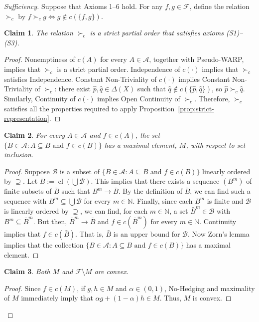 \documentclass[11pt]{article}
\newtheorem{claim}{Claim}
\begin{document}
\begin{proof}[Sufficiency]
Suppose that Axioms 1--6 hold.
For any $f,g\in\mathcal{F}$, define the relation $\succ_c$ by
$f\succ_c g\Longleftrightarrow g\notin c(\{f,g\})$.

\begin{claim}\label{cl:binary-order}
The relation $\succ_c$ is a strict partial order that satisfies axioms
(S1)--(S3).
\end{claim}
\begin{proof}
Nonemptiness of $c(A)$ for every $A\in\mathcal{A}$, together with
Pseudo-WARP, implies that $\succ_c$ is a strict partial order.
Independence of $c(\cdot)$ implies that $\succ_c$ satisfies Independence.
Constant Non-Triviality of $c(\cdot)$ implies Constant Non-Triviality
of $\succ_c$: there exist $\hat p,\hat q\in\Delta(X)$ such that
$\hat q\notin c(\{\hat p,\hat q\})$, so $\hat p\succ_c\hat q$.
Similarly, Continuity of $c(\cdot)$ implies Open Continuity of $\succ_c$.
Therefore, $\succ_c$ satisfies all the properties required to apply
Proposition~\ref{prop:strict-representation}.
\end{proof}

\begin{claim}\label{cl:maximal-menu}
For every $A\in\mathcal{A}$ and $f\in c(A)$, the set
$\{B\in\mathcal{A}: A\subseteq B\text{ and }f\in c(B)\}$ has a maximal
element, $M$, with respect to set inclusion.
\end{claim}
\begin{proof}
Suppose $\mathcal{B}$ is a subset of
$\{B\in\mathcal{A}: A\subseteq B\text{ and }f\in c(B)\}$ linearly ordered
by $\supseteq$. Let $\bar{B}:=\operatorname{cl}(\bigcup\mathcal{B})$.
This implies that there exists a sequence $(B^m)$ of finite subsets of
$\bar{B}$ such that $B^m\to\bar{B}$. By the definition of $\bar{B}$, we
can find such a sequence with $B^m\subseteq\bigcup\mathcal{B}$ for every
$m\in\mathbb{N}$. Finally, since each $B^m$ is finite and $\mathcal{B}$
is linearly ordered by $\supseteq$, we can find, for each $m\in\mathbb{N}$,
a set $\bar{B}^m\in\mathcal{B}$ with $B^m\subseteq\bar{B}^m$. But then,
$\bar{B}^m\to\bar{B}$ and $f\in c(\bar{B}^m)$ for every
$m\in\mathbb{N}$. Continuity implies that $f\in c(\bar{B})$. That is,
$\bar{B}$ is an upper bound for $\mathcal{B}$. Now Zorn's lemma implies
that the collection
$\{B\in\mathcal{A}: A\subseteq B\text{ and }f\in c(B)\}$ has a maximal
element.
\end{proof}

\begin{claim}\label{cl:convex-menu}
Both $M$ and $\mathcal{F}\setminus M$ are convex.
\end{claim}
\begin{proof}
Since $f\in c(M)$, if $g,h\in M$ and $\alpha\in(0,1)$,
No-Hedging and maximality of $M$ immediately imply that
$\alpha g+(1-\alpha)h\in M$. Thus, $M$ is convex.


\end{proof}
\end{proof}
\end{document}
